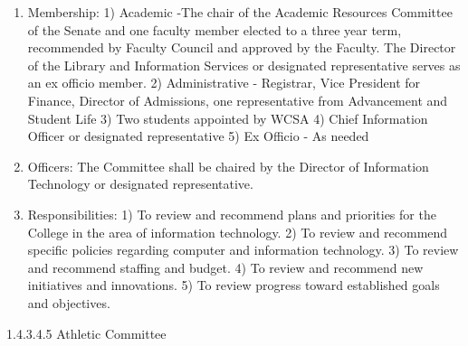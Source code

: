 \documentclass[letterpaper, 11pt]{article}
\begin{document}
				\begin{enumerate}[label=\alph*)]
					\item{Membership:}
					1) Academic -The chair of the Academic Resources Committee of the Senate and one faculty member elected to a three year term, recommended by Faculty Council and approved by the Faculty.  The Director of the Library and Information Services or designated representative serves as an ex officio member.
					2) Administrative - Registrar, Vice President for Finance, Director of Admissions, one representative from Advancement and Student Life
					3) Two students appointed by WCSA
					4) Chief Information Officer or designated representative
					5) Ex Officio - As needed
					\item{Officers:}
					The Committee shall be chaired by the Director of Information Technology or designated representative.
					\item{Responsibilities:}
					1) To review and recommend plans and priorities for the College in the area of information technology.
					2) To review and recommend specific policies regarding computer and information technology.
					3) To review and recommend staffing and budget.
					4) To review and recommend new initiatives and innovations.
					5) To review progress toward established goals and objectives.
				\end{enumerate}
				1.4.3.4.5 Athletic Committee
\end{document}
